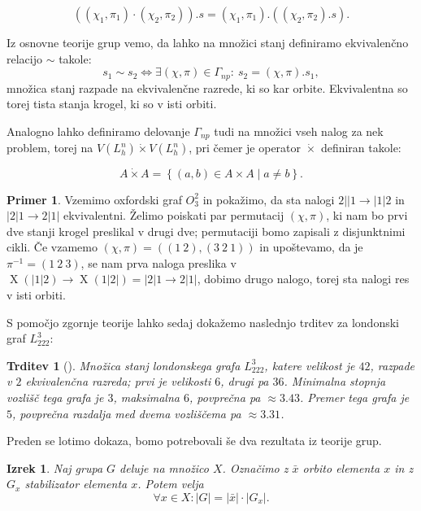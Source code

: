 \documentclass[12pt,a4paper]{amsart}
\theoremstyle{definition} %
\newtheorem{primer}[definicija]{Primer}
\theoremstyle{plain} %
\newtheorem{izrek}[definicija]{Izrek}
\newtheorem{trditev}[definicija]{Trditev}
\DeclareMathOperator {\X}{X}
\begin{document}
\[ \left((\chi_1,\pi_1) \cdot (\chi_2,\pi_2)\right).s = (\chi_1,\pi_1) . ((\chi_2,\pi_2).s) .\]

Iz osnovne teorije grup vemo, da lahko na množici stanj definiramo ekvivalenčno relacijo $\sim$ takole:
\[ s_1 \sim s_2 \iff \exists (\chi,\pi) \in \Gamma_{np}\colon \ s_2 = (\chi,\pi).s_1, \]
množica stanj razpade na ekvivalenčne razrede, ki so kar orbite. Ekvivalentna so torej tista stanja krogel, ki so v isti orbiti.

Analogno lahko definiramo delovanje $\Gamma_{np}$ tudi na množici vseh nalog za nek problem, torej na $V(L^n_h) \dot{\times} V(L^n_h)$, pri čemer je operator $\dot{\times}$ definiran takole:

\[ A \dot{\times} A = \left\{ (a,b) \in A \times A \mid a \neq b \right\} .\]

\begin{primer}
    \label{primer:oxf-ekv-nalogi}
    Vzemimo oxfordski graf $O^2_3$ in pokažimo, da sta nalogi $2||1 \rightarrow |1|2$ in $|2|1 \rightarrow 2|1|$ ekvivalentni. Želimo poiskati par permutacij $(\chi, \pi)$, ki nam bo prvi dve stanji krogel preslikal v drugi dve; permutaciji bomo zapisali z disjunktnimi cikli. Če vzamemo $(\chi, \pi) = ((1\ 2), (3\ 2\ 1))$ in upoštevamo, da je $\pi^{-1}=(1\ 2\ 3)$, se nam prva naloga preslika v $\X(|1|2) \rightarrow \X(1|2|) = |2|1 \rightarrow 2|1|$, dobimo drugo nalogo, torej sta nalogi res v isti orbiti.
\end{primer}
\medskip

S pomočjo zgornje teorije lahko sedaj dokažemo naslednjo trditev za londonski graf $L_{222}^3$:

\begin{trditev}[{\cite[Proposition~7.5.]{bib:tohmyths}}]
    \label{trd:simetrije-L222na3}
    Množica stanj londonskega grafa $L_{222}^3$, katere velikost je $42$, razpade v $2$ ekvivalenčna razreda; prvi je velikosti $6$, drugi pa $36$. Minimalna stopnja vozlišč tega grafa je $3$, maksimalna $6$, povprečna pa $\approx 3.43$. Premer tega grafa je $5$, povprečna razdalja med dvema vozliščema pa $\approx 3.31$. 
\end{trditev}

Preden se lotimo dokaza, bomo potrebovali še dva rezultata iz teorije grup. 

\begin{izrek}
    Naj grupa $G$ deluje na množico $X$. Označimo z $\bar{x}$ orbito elementa $x$ in z $G_x$ stabilizator elementa $x$. Potem velja
    \begin{equation}
        \forall x \in X: |G| = |\bar{x}| \cdot |G_x| .
        \label{eq:orb-stab}
    \end{equation}
\end{izrek}
\end{document}
